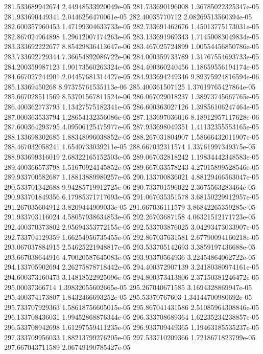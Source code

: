 {281.533689942674 2.44948533920049e-05
281.733690196008 1.36785022325347e-05
281.933690449341 2.0446256470061e-05
282.40035770712 2.08269513560394e-05
282.600357960453 1.47199304633733e-05
282.733691462676 1.45013775173031e-05
282.867024964898 1.29612007174263e-05
283.133691969343 1.71450083049834e-05
283.333692222677 8.85429836413647e-06
283.467025724899 1.00554456850786e-05
283.733692729344 7.36654892086722e-06
284.000359733789 1.31767554693733e-05
284.200359987123 1.90173560263324e-05
284.400360240456 1.18659556194174e-05
284.667027244901 2.04457681314427e-05
284.933694249346 9.89375924816594e-06
285.13369450268 8.97375761535113e-06
285.400361507125 1.37619765427864e-05
285.667028511569 8.53701567811524e-06
286.067029018237 1.38973745667765e-05
286.400362773793 1.13427575182341e-05
286.600363027126 1.39856106247464e-05
287.000363533794 1.28654132356086e-05
287.133697036016 8.18912957117628e-06
287.600364293795 4.09506125475977e-05
287.933698049351 1.41132355553165e-05
288.133698302685 1.88348996038852e-05
288.267031804907 1.58666432011907e-05
288.467032058241 1.6540733039211e-05
288.667032311574 1.33761997349375e-05
288.933699316019 2.68322165152503e-05
289.067032818242 1.19834442348583e-05
289.400366573798 1.51670924145852e-05
289.667033578243 4.27015899528546e-05
289.933700582687 1.18813889980257e-05
290.133700836021 4.88129466563047e-05
290.533701342688 9.94285719912725e-06
290.733701596022 2.3675563283464e-05
290.933701849356 6.17985371717693e-05
291.067035351578 3.68150229912957e-05
291.267035604912 3.8209444909033e-05
291.667036111579 3.86842265359285e-05
291.933703116024 4.58057938634853e-05
292.26703687158 4.06321512171723e-05
292.400370373802 2.95694353772155e-05
292.533703876025 3.04293473033907e-05
292.733704129359 1.66254956735455e-05
292.867037631581 2.67790094160218e-05
293.067037884915 2.54625221948817e-05
293.533705142693 3.3859197436688e-05
293.667038644916 4.70020587645083e-05
293.93370564936 3.22454864062722e-05
294.133705902694 2.26275878718442e-05
294.400372907139 3.24180380974161e-05
294.600373160473 3.14818522925096e-05
294.800373413806 2.37150381246472e-05
295.00037366714 1.39832055602665e-05
295.267040671585 3.1694328869947e-05
295.400374173807 1.8432466693252e-05
295.53370767603 1.34144700980692e-05
295.733707929363 1.58618756605015e-05
295.867041431586 2.51085964308846e-05
296.133708436031 1.99452868876344e-05
296.333708689364 1.62235234238857e-05
296.533708942698 1.61297559411235e-05
296.933709449365 1.19463185535237e-05
297.333709956033 1.88213799276205e-05
297.533710209366 1.7218671823799e-05
297.667043711589 2.06749190785427e-05
}
